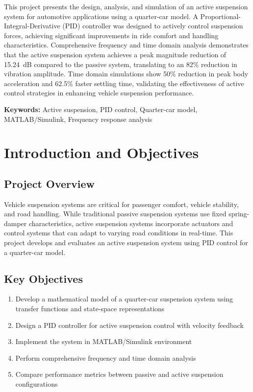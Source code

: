 \documentclass[12pt,a4paper]{article}
\begin{document}
This project presents the design, analysis, and simulation of an active suspension system for automotive applications using a quarter-car model. A Proportional-Integral-Derivative (PID) controller was designed to actively control suspension forces, achieving significant improvements in ride comfort and handling characteristics. Comprehensive frequency and time domain analysis demonstrates that the active suspension system achieves a peak magnitude reduction of \SI{15.24}{dB} compared to the passive system, translating to an 82\% reduction in vibration amplitude. Time domain simulations show 50\% reduction in peak body acceleration and 62.5\% faster settling time, validating the effectiveness of active control strategies in enhancing vehicle suspension performance.

\textbf{Keywords:} Active suspension, PID control, Quarter-car model, MATLAB/Simulink, Frequency response analysis

\section{Introduction and Objectives}

\subsection{Project Overview}
Vehicle suspension systems are critical for passenger comfort, vehicle stability, and road handling. While traditional passive suspension systems use fixed spring-damper characteristics, active suspension systems incorporate actuators and control systems that can adapt to varying road conditions in real-time. This project develops and evaluates an active suspension system using PID control for a quarter-car model.

\subsection{Key Objectives}
\begin{enumerate}
    \item Develop a mathematical model of a quarter-car suspension system using transfer functions and state-space representations
    \item Design a PID controller for active suspension control with velocity feedback
    \item Implement the system in MATLAB/Simulink environment
    \item Perform comprehensive frequency and time domain analysis
    \item Compare performance metrics between passive and active suspension configurations
\end{enumerate}
\end{document}
